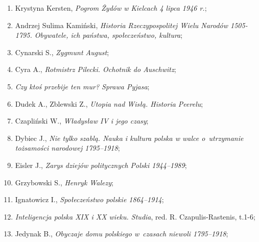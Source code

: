 \documentclass[a4paper,11pt]{article}
\begin{document}
\begin{enumerate}
\item Krystyna Kersten, \textit{Pogrom Żydów w Kielcach 4 lipca 1946
    r.};



\item Andrzej Sulima Kamiński, \textit{Historia Rzeczypospolitej Wielu
    Narodów 1505-1795. Obywatele, ich państwa, społeczeństwo,
    kultura};



\item Cynarski S., \textit{Zygmunt August};



\item Cyra A., \textit{Rotmistrz Pilecki. Ochotnik do Auschwitz};



\item \textit{Czy ktoś przebije ten mur? Sprawa Pyjasa};



\item Dudek A., Zblewski Z., \textit{Utopia nad Wisłą. Historia
    Peerelu};



\item Czapliński W., \textit{Władysław IV i jego czasy};



\item Dybiec J., \textit{Nie tylko szablą. Nauka i kultura polska w
    walce o~utrzymanie tożsamości narodowej 1795--1918};



\item Eisler J., \textit{Zarys dziejów politycznych Polski 1944--1989};



\item Grzybowski S., \textit{Henryk Walezy};



\item Ignatowicz I., \textit{Społeczeństwo polskie 1864--1914};



\item \textit{Inteligencja polska XIX i XX wieku. Studia}, red. R.
  Czapulis-Rastenis, t.1-6;



\item Jedynak B., \textit{Obyczaje domu polskiego w~czasach niewoli
    1795--1918};




\end{enumerate}
\end{document}
